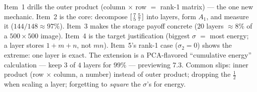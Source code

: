 \documentclass[10pt]{article}
\begin{document}
\begin{teachernote}
Item~1 drills the outer product (column $\times$ row $=$ rank-1 matrix) --- the one new mechanic. Item~2 is
the core: decompose $\begin{bsmallmatrix} 7 & 5\\ 5 & 7 \end{bsmallmatrix}$ into layers, form $A_1$, and
measure it ($144/148\approx97\%$). Item~3 makes the storage payoff concrete ($20$ layers $\approx8\%$ of a
$500\times500$ image). Item~4 is the target justification (biggest $\sigma$ $=$ most energy; a layer stores
$1+m+n$, not $mn$). Item~5's rank-1 case ($\sigma_2=0$) shows the extreme: one layer is exact. The
extension is a PCA-flavored ``cumulative energy'' calculation --- keep $3$ of $4$ layers for $99\%$ ---
previewing 7.3. Common slips: inner product (row $\times$ column, a number) instead of outer product;
dropping the $\tfrac12$ when scaling a layer; forgetting to \emph{square} the $\sigma$'s for energy.
\end{teachernote}
\end{document}
